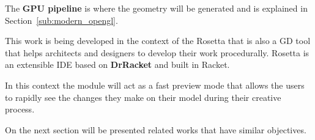 The \textbf{GPU pipeline} is where the geometry will be generated and is explained in Section~\ref{sub:modern_opengl}.


This work is being developed in the context of the Rosetta that is also a GD tool that helps architects and designers to develop their work procedurally. Rosetta is an extensible IDE based on \textbf{DrRacket} and built in Racket. 

In this context the module will act as a fast preview mode that allows the users to rapidly see the changes they make on their model during their creative process.

On the next section will be presented related works that have similar objectives.




